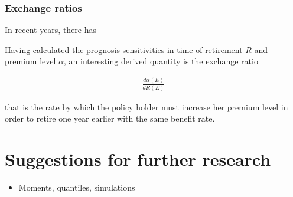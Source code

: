 \documentclass{article}
\newcommand{\1}[1]{\mathbbm{1}_{\left\lbrace #1 \right\rbrace}}
\theoremstyle{break}
\theoremstyle{remark}
\numberwithin{equation}{section}
\begin{document}
\subsubsection{Exchange ratios}

In recent years, there has

Having calculated the prognosis sensitivities in time of retirement $R$ and premium level $\alpha$, an interesting derived quantity is the exchange ratio

\begin{align*}
	\frac{d \alpha (E)}{d R (E)}
\end{align*}

that is the rate by which the policy holder must increase her premium level in order to retire one year earlier with the same benefit rate. 

\newpage
\section{Suggestions for further research}

\begin{itemize}
	\item Moments, quantiles, simulations
\end{itemize}

\newpage




\newpage
\end{document}
